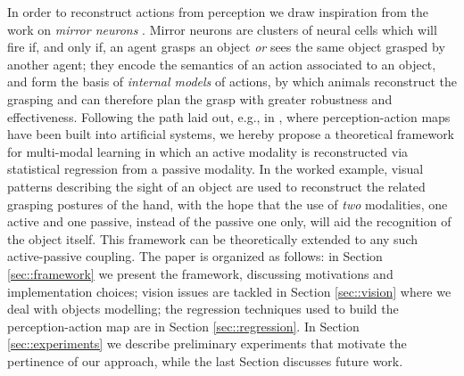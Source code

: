 In order to reconstruct actions from perception we draw inspiration from the work on \emph{mirror neurons} \cite{gallese,rizz}. Mirror neurons are clusters of neural cells which will fire if, and only if, an agent grasps an object \emph{or} sees the same object grasped by another agent; they encode the semantics of an action associated to an object, and form the basis of \emph{internal models} of actions, by which animals reconstruct the grasping and can therefore plan the grasp with greater robustness and effectiveness.
Following the path laid out, e.g., in \cite{metta,2007.AR}, where perception-action maps have been built into artificial systems, we hereby propose a theoretical framework for multi-modal learning in which an active modality is reconstructed via statistical regression from a passive modality. In the worked example, visual patterns describing the sight of an object are used to reconstruct the related grasping postures of the hand, with the hope that the use of \emph{two} modalities, one active and one passive, instead of the passive one only, will aid the recognition of the object itself. This framework can be theoretically extended to any such active-passive coupling.
The paper is organized as follows: in Section \ref{sec::framework} we present the framework, discussing motivations and implementation choices; vision issues are tackled in Section \ref{sec::vision} where we deal with objects modelling; the regression techniques used to build the perception-action map are in Section \ref{sec::regression}. In Section \ref{sec::experiments} we describe preliminary experiments that motivate the pertinence of our approach, while the last Section discusses future work.


